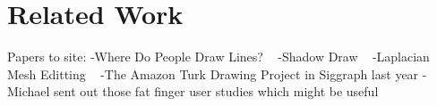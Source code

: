 \section{Related Work}

Papers to site:
-Where Do People Draw Lines? ~\cite{Cole:2008}
-Shadow Draw ~\cite{Lee:2011}
-Laplacian Mesh Editting ~\cite{Sorkine:2004}
-The Amazon Turk Drawing Project in Siggraph last year 
-Michael sent out those fat finger user studies which might be useful


